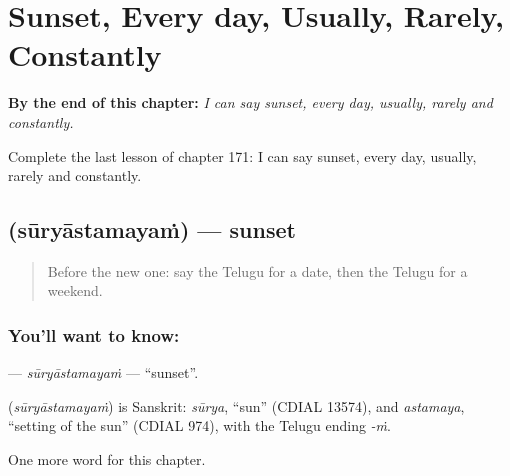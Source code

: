 
\chapter{Sunset, Every day, Usually, Rarely, Constantly}
\label{ch:te-sunset-every-day-usually-rarely-constantly}

\begin{chapteropening}
\textbf{By the end of this chapter:} \emph{I can say sunset, every day, usually, rarely and constantly.}

Complete the last lesson of chapter 171: I can say sunset, every day, usually, rarely and constantly.
\end{chapteropening}

\section[\texorpdfstring{\te{సూర్యాస్తమయం} (sūryāstamayaṁ)}{సూర్యాస్తమయం (sūryāstamayaṁ)}]{ (sūryāstamayaṁ) — sunset}

\label{lesson:TE-C171-suryastamayam}



\begin{quote}
Before the new one: say the Telugu for a date, then the Telugu for a weekend.
\end{quote}

\subsection*{You'll want to know: }
\textbf{} — \emph{sūryāstamayaṁ} — \textquotedblleft{}sunset\textquotedblright{}.

\begin{cousinweb}
\textbf{} (\emph{sūryāstamayaṁ}) is Sanskrit: \emph{sūrya}, \textquotedblleft{}sun\textquotedblright{} (CDIAL 13574), and \emph{astamaya}, \textquotedblleft{}setting of the sun\textquotedblright{} (CDIAL 974), with the Telugu ending \emph{-ṁ}.
\end{cousinweb}

\begin{grammarlens}[title={What you've built}]
One more word for this chapter.
\end{grammarlens}

